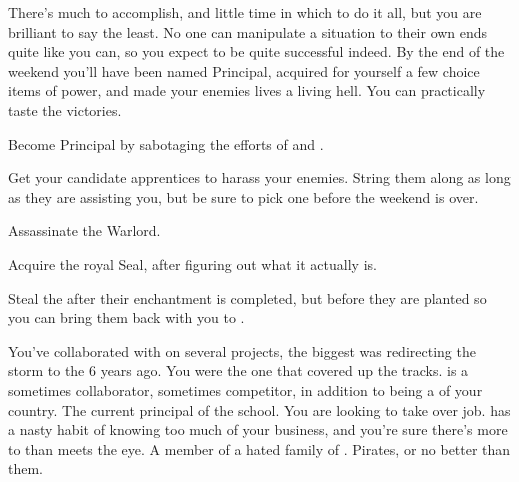 \documentclass[char]{GL2020}
\begin{document}
There’s much to accomplish, and little time in which to do it all, but you are brilliant to say the least.  No one can manipulate a situation to their own ends quite like you can, so you expect to be quite successful indeed.  By the end of the weekend you’ll have been named Principal, acquired for yourself a few choice items of power, and made your enemies lives a living hell.  You can practically taste the victories.


\begin{itemz}[Goals]
	\item Become Principal by sabotaging the efforts of \cMusic{} and \cBeetle{}.
	\item Get your candidate apprentices to harass your enemies. String them along as long as they are assisting you, but be sure to pick one before the weekend is over.
\item Assassinate the \pShippies{} Warlord.
\item Acquire the \pFarm{} royal Seal, after figuring out what it actually is.
\item Steal the \iBeans{} after their enchantment is completed, but before they are planted so you can bring them back with you to \pFarm{}.
\end{itemz}

\begin{itemz}[Notes]
	\item 
\end{itemz}

\begin{contacts}
	\contact{\cDiplomat{}} You’ve collaborated with \cDiplomat{} on several projects, the biggest was redirecting the storm to the \pShip{} 6 years ago. You were the one that covered up the tracks.
	\contact{\cPrince{}} is a sometimes collaborator, sometimes competitor, in addition to being a \cPrince{\Heir} of your country.
\contact{\cPrincipal{}} The current principal of the school. You are looking to take over \cPrincipal{\their} job.
\contact{\cInterpol{}} has a nasty habit of knowing too much of your business, and you’re sure there’s more to \cInterpol{\them} than meets the eye.
\contact{\cJuniorStatesman{}} A member of a hated family of \pShippies{}. Pirates, or no better than them.
\end{contacts}
\end{document}
